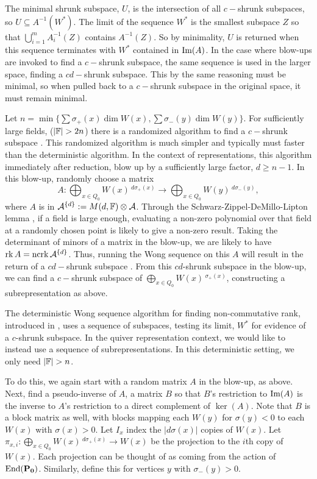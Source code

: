 The minimal shrunk subspace, $U$, is the intersection of all $c-$shrunk subspaces, so $U\subseteq A^{-1}(W^*)$. The limit of the sequence $W^*$ is the smallest subspace $Z$ so that $\displaystyle\bigcup_{i=1}^m A_i^{-1}(Z)$ contains $A^{-1}(Z)$. So by minimality, $U$ is returned when this sequence terminates with $W^*$ contained in $\operatorname{Im}(A)$. In the case where blow-ups are invoked to find a $c-$shrunk subspace, the same sequence is used in the larger space, finding a $cd-$shrunk subspace. This by the same reasoning must be minimal, so when pulled back to a $c-$shrunk subspace in the original space, it must remain minimal.  

Let $n=\min\{\sum \sigma_+(x)\dim W(x),\sum \sigma_-(y)\dim W(y)\}$. For sufficiently large fields, ($|\F|>2n$) there is a randomized algorithm to find a $c-$shrunk subspace \cite[Corollary 1.5]{IQS17}. This randomized algorithm is much simpler and typically must faster than the deterministic algorithm. In the context of representations, this algorithm immediately after reduction, blow up by a sufficiently large \cite{IQS18,DM18} factor, $d\geq n-1$. In this blow-up, randomly choose a matrix
$$A:\bigoplus_{x\in Q_0} W(x)\,^{d\sigma_+(x)}\rightarrow\bigoplus_{x\in Q_0}W(y)\,^{d\sigma_-(y)},$$
where $A$ is in $\mathcal{A}^{\{d\}}:=M(d,{\mathbb F})\otimes\mathcal{A}$.
Through the Schwarz-Zippel-DeMillo-Lipton lemma \cite{Schw80,Zip79,DL78}, if a field is large enough, evaluating a non-zero polynomial over that field at a randomly chosen point is likely to give a non-zero result. Taking the determinant of minors of a matrix in the blow-up, we are likely to have $\operatorname{rk} A= \operatorname{ncrk} \mathcal{A}^{\{d\}}$. Thus, running the Wong sequence on this $A$ will result in the return of a $cd-$shrunk subspace \cite[Lemma 9]{IKQS15}. From this $cd$-shrunk subspace in the blow-up, we can find a $c-$shrunk subspace of $\bigoplus_{x\in Q_0} W(x)\,^{\sigma_+(x)}$, constructing a subrepresentation as above.

The deterministic Wong sequence algorithm for finding non-commutative rank, introduced in \cite{IKQS15}, uses a sequence of subspaces, testing its limit, $W^*$ for evidence of a $c$-shrunk subspace. In the quiver representation context, we would like to instead use a sequence of subrepresentations. In this deterministic setting, we only need $|\F|>n$.

To do this, we again start with a random matrix $A$ in the blow-up, as above. Next, find a pseudo-inverse of $A$, a matrix $B$ so that $B$'s restriction to $\operatorname{Im}(A)$ is the inverse to $A$'s restriction to a direct complement of $\ker(A)$. Note that $B$ is a block matrix as well, with blocks mapping each $W(y)$ for $\sigma(y)<0$ to each $W(x)$ with $\sigma(x)>0$. Let $I_x$ index the $|d\sigma(x)|$ copies of $W(x)$. Let $\pi_{x,i}:\bigoplus_{x\in Q_0} W(x)\,^{d\sigma_+(x)}\rightarrow W(x)$ be the projection to the $i$th copy of $W(x)$. Each projection can be thought of as coming from the action of $\operatorname{End}(\mathbf{P_0})$. Similarly, define this for vertices $y$ with $\sigma_{-}(y)>0$. 

